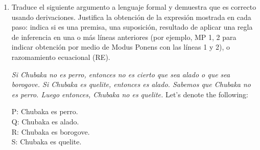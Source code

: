 \documentclass[a4paper,10pt]{article}
\begin{document}
\begin{enumerate}
\begin{multicols}{2}
2. \\
   - $A \to B$, agregamos $\neg A$ y $B$\\
   - $\neg (A \lor B)$, agregamos $\neg A$ yand $\neg B$\\
   - $\neg (A \land B)$, agregamos $\neg A$ o $\neg B$\\
\end{multicols}
\begin{multicols}{2}
3. Tenemos\\
   - $(r \lor u) \to s$, agregamos\\
   $\neg (r \lor u)$ y $s$\\
   - $r$, agregamos $r$\\
   - $s \to t$, agregamos $\neg s$ y $t$\\
   - $\neg (t \lor u)$, agregamos $\neg t$ y $\neg u$\\
\newline
\newline
\newline
{}. Así\\
   - $\neg (r \lor u)$\\
   - $s$\\
   - $r$\\
   - $\neg s$\\
   - $t$\\
   - $\neg t$\\
   - $\neg u$\\
\end{multicols}
5. Tiene $s$, $\neg s$, $t$ y $\neg t$. Hay una contradicción (!)\\
$\therefore$ el argumento es válido\\
		
	\item {}
		Traduce el siguiente argumento a lenguaje formal y demuestra que
		es correcto usando derivaciones. Justifica la obtención de la expresión mostrada en cada paso: indica si es una premisa, una suposición, resultado de aplicar una regla de inferencia en una o más líneas anteriores (por ejemplo, MP 1, 2 para indicar obtención por medio de Modus Ponens con las líneas 1 y 2), o razomamiento ecuacional (RE).
		
		\vspace{5pt}
		
		\textit{Si Chubaka no es perro, entonces no es cierto que sea alado o que sea borogove. Si Chubaka es quelite, entonces es alado. Sabemos que Chubaka no es perro. Luego entonces, Chubaka no es quelite.}
    Let's denote the following:
\begin{multicols}{2}
    P: Chubaka es perro. \\
    Q: Chubaka es alado.\\
    R: Chubaka es borogove.\\
    S: Chubaka es quelite.\\


\end{multicols}
\end{enumerate}
\end{document}
